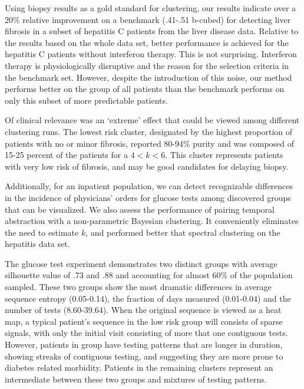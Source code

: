  Using biopsy results as a gold standard for clustering, our results indicate over a 20\% relative improvement on a benchmark (.41-.51 b-cubed) for detecting liver fibrosis in a subset of hepatitis C patients from the liver disease data.  Relative to the results based on the whole data set, better performance is achieved for the hepatitis C patients without interferon therapy.  This is not surprising.  Interferon therapy is physiologically disruptive and the reason for the selection criteria in the benchmark set.  However, despite the introduction of this noise, our method performs better on the group of all patients than the benchmark performs on only this subset of more predictable patients.

Of clinical relevance was an `extreme' effect that could be viewed among different clustering runs.  The lowest risk cluster, designated by the highest proportion of patients with no or minor fibrosis, reported 80-94\% purity and was composed of 15-25 percent of the patients for a $4<k<6$.  This cluster represents patients with very low risk of fibrosis, and may be good candidates for delaying biopsy.

Additionally, for an inpatient population, we can detect recognizable differences in the incidence of physicians' orders for glucose tests among discovered groups that can be visualized. We also assess the performance of pairing temporal abstraction with a non-parametric Bayesian clustering.  It conveniently eliminates the need to estimate $k$, and  performed better that spectral clustering on the hepatitis data set.

The glucose test experiment demonstrates two distinct groups with average silhouette value of .73 and .88 and accounting for almost 60\% of the population sampled.  These two groups show the most dramatic differences in average sequence entropy (0.05-0.14), the fraction of days measured (0.01-0.04) and the number of tests (8.60-39.64).  When the original sequence is viewed as a heat map, a typical patient's sequence in the low risk group will consists of sparse signals, with only the initial visit consisting of more that one contiguous tests.  However, patients in group have testing patterns that are longer in duration, showing streaks of contiguous testing, and suggesting they are more prone to diabetes related morbidity.  Patients in the remaining clusters represent an intermediate between these two groups and mixtures of testing patterns.

